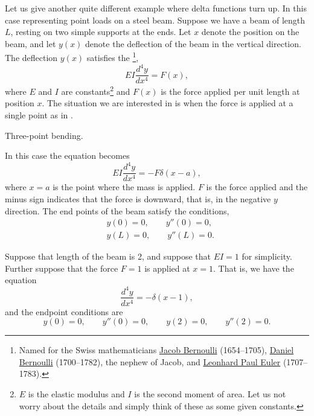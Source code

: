 \documentclass{ximera}
\begin{document}
Let us give another quite different example where delta functions turn up.  In this case representing point loads on a steel beam.  Suppose we have a beam of length $L$, resting on two simple supports at the ends.  Let $x$ denote the position on the beam, and let $y(x)$ denote the deflection of the beam in the vertical direction.  The deflection $y(x)$ satisfies the \emph{}%
\footnote{
    Named for the Swiss mathematicians \href{https://en.wikipedia.org/wiki/Jacob_Bernoulli}{Jacob Bernoulli} (1654--1705), \href{https://en.wikipedia.org/wiki/Daniel_Bernoulli}{Daniel Bernoulli} (1700--1782), the nephew of Jacob, and \href{https://en.wikipedia.org/wiki/Euler}{Leonhard Paul Euler} (1707--1783).
    },
\begin{equation*}
    EI \frac{d^4 y}{dx^4} = F(x) ,
\end{equation*}
where $E$ and $I$ are constants\footnote{$E$ is the elastic modulus and $I$ is the second moment of area.  Let us not worry about the details and simply think of these as some given constants.} and $F(x)$ is the force applied per unit length at position $x$.  The situation we are interested in is when the force is applied at a single point as in .

\begin{myfig}
    \capstart
    
    \caption{Three-point bending.\label{lt:beambendingfig}}
\end{myfig}

In this case the equation becomes
\begin{equation*}
    EI \frac{d^4 y}{dx^4} = -F \delta(x-a) ,
\end{equation*}
where $x=a$ is the point where the mass is applied.  $F$ is the force applied and the minus sign indicates that the force is downward, that is, in the negative $y$ direction.  The end points of the beam satisfy the conditions,
\begin{align*}
    & y(0) = 0, \qquad y''(0) = 0, \\
    & y(L) = 0, \qquad y''(L) = 0.
\end{align*}


\begin{example} \label{lt:examplebeam}
    Suppose that length of the beam is 2, and suppose that $EI=1$ for simplicity.  Further suppose that the force $F=1$ is applied at $x=1$. That is, we have the equation
    \begin{equation*}
        \frac{d^4 y}{dx^4} = -\delta(x-1) ,
    \end{equation*}
    and the endpoint conditions are
    \begin{equation*}
        y(0) = 0, \qquad y''(0) = 0, \qquad y(2) = 0, \qquad y''(2) = 0.
    \end{equation*}
\end{example}
\end{document}
